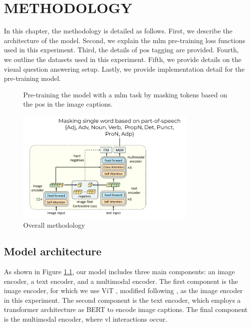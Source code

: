 \chapter{METHODOLOGY}
In this chapter, the methodology is detailed as follows. 
First, we describe the architecture of the model. 
Second, we explain the \acrshort{mlm} pre-training loss functions used in this experiment.
Third, the details of \acrshort{pos} tagging are provided. 
Fourth, we outline the datasets used in this experiment. 
Fifth, we provide details on the visual question answering setup.
Lastly, we provide implementation detail for the pre-training model.

\begin{figure}[h]
    \caption{Overall methodology}
    \label{fig:overview}
    Pre-training the model with a \acrshort{mlm} task by masking tokens based on the \acrshort{pos} in the image captions.
    \begin{center}
        \includegraphics[width=0.8\textwidth]{Images/overview.png}
    \end{center}
    \small
\end{figure}

\section{Model architecture}
As shown in Figure \ref{fig:overview}, our model includes three main components: an image encoder, a text encoder, and a multimodal encoder. 
The first component is the image encoder, for which we use ViT \cite{vit}, modified following \cite{clip}, as the image encoder in this experiment. 
The second component is the text encoder, which employs a transformer architecture as BERT \cite{bert} to encode image captions.
The final component is the multimodal encoder, where \acrshort{vl} interactions occur.

